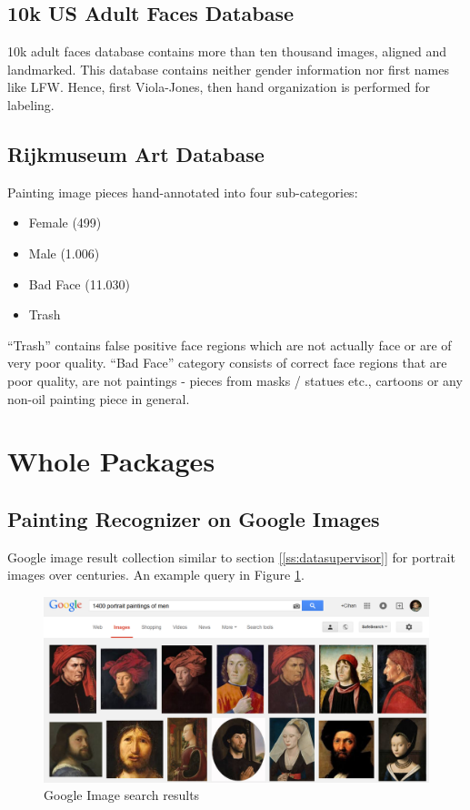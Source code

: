 \documentclass[runningheads]{llncs}
\begin{document}
\subsection{10k US Adult Faces Database}\label{ss-db10k}
10k adult faces\cite{bainbridge2013intrinsic} database contains more than ten thousand images, aligned and landmarked. This database contains neither gender information nor first names like LFW. Hence, first Viola-Jones, then hand organization is performed for labeling.

\subsection{Rijkmuseum Art Database}\label{ss-dbRijk}
Painting\cite{rijksmuseum1976tot} image pieces hand-annotated into four sub-categories:

\begin{itemize}
	\item Female (499)
	\item Male (1.006)
	\item Bad Face (11.030)
	\item Trash
\end{itemize}

“Trash” contains false positive face regions which are not actually face or are of very poor quality. “Bad Face” category consists of correct face regions that are poor quality, are not paintings - pieces from masks / statues etc., cartoons or any non-oil painting piece in general.


\section{Whole Packages}

\subsection{Painting Recognizer on Google Images}

Google image result collection similar to section \ref{[ss:datasupervisor]} for portrait images over centuries. An example query in Figure \ref{pr-googleres}.

\begin{figure}
	\centering
	\includegraphics[width=.8\textwidth]{PaintingRecognizer-query_results}
	\caption{Google Image search results}
	\label{pr-googleres}	
\end{figure}
\end{document}
